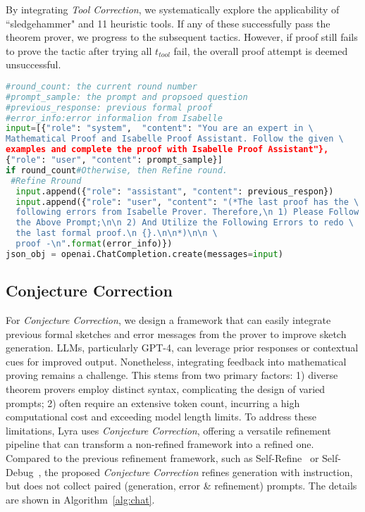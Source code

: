 \documentclass{article} \usepackage{iclr2024_conference,times}
\def\methodOneFull{\textit{Tool Correction}\xspace}
\def\methodTwoFull{\textit{Conjecture Correction}\xspace}
\def\shortname{Lyra\xspace}
\begin{document}
By integrating \methodOneFull, we systematically explore the applicability of ``sledgehammer" and 11 heuristic tools. If any of these successfully pass the theorem prover, we progress to the subsequent tactics. However, if proof still fails to prove the tactic after trying all $t_{tool}$ fail, the overall proof attempt is deemed unsuccessful.
\begin{algorithm}[t]
\caption{Pseudocode of \methodTwoFull in a Python-like style.}
\label{alg:chat}
\small


\begin{lstlisting}[language=python]
#round_count: the current round number
#prompt_sample: the prompt and propsoed question
#previous_response: previous formal proof
#error_info:error informalion from Isabelle
input=[{"role": "system",  "content": "You are an expert in \
Mathematical Proof and Isabelle Proof Assistant. Follow the given \ 
examples and complete the proof with Isabelle Proof Assistant"},
{"role": "user", "content": prompt_sample}]
if round_count#Otherwise, then Refine round.
 #Refine Rround
  input.append({"role": "assistant", "content": previous_respon})
  input.append({"role": "user", "content": "(*The last proof has the \
  following errors from Isabelle Prover. Therefore,\n 1) Please Follow  \
  the Above Prompt;\n\n 2) And Utilize the Following Errors to redo \
  the last formal proof.\n {}.\n\n*)\n\n \
  proof -\n".format(error_info)})
json_obj = openai.ChatCompletion.create(messages=input)
\end{lstlisting}
\end{algorithm}
\subsection{Conjecture Correction}
For \methodTwoFull, we design a framework that can easily integrate previous formal sketches and error messages from the prover to improve sketch generation. LLMs, particularly GPT-4, can leverage prior responses or contextual cues for improved output. Nonetheless, integrating feedback into mathematical proving remains a challenge. This stems from two primary factors: 1) diverse theorem provers employ distinct syntax, complicating the design of varied prompts; 2) often require an extensive token count, incurring a high computational cost and exceeding model length limits. To address these limitations, \shortname uses \methodTwoFull, offering a versatile refinement pipeline that can transform a non-refined framework into a refined one.  Compared to the previous refinement framework, such as Self-Refine~\citep{madaan2023selfrefine} or Self-Debug~\citep{chen2023teaching}, the proposed \methodTwoFull refines generation with instruction, but does not collect paired (generation, error \& refinement) prompts. The details are shown in Algorithm~\ref{alg:chat}.
\end{document}
